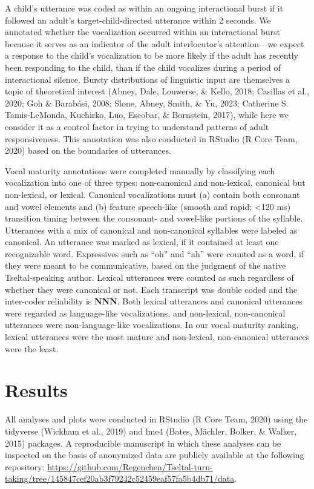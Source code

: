 \documentclass[
  man]{apa6}
\begin{document}
A child's utterance was coded as within an ongoing interactional burst if it followed an adult's target-child-directed utterance within 2 seconds. We annotated whether the vocalization occurred within an interactional burst because it serves as an indicator of the adult interlocutor's attention---we expect a response to the child's vocalization to be more likely if the adult has recently been responding to the child, than if the child vocalizes during a period of interactional silence. Bursty distributions of linguistic input are themselves a topic of theoretical interest (Abney, Dale, Louwerse, \& Kello, 2018; Casillas et al., 2020; Goh \& Barabási, 2008; Slone, Abney, Smith, \& Yu, 2023; Catherine S. Tamis-LeMonda, Kuchirko, Luo, Escobar, \& Bornstein, 2017), while here we consider it as a control factor in trying to understand patterns of adult responsiveness. This annotation was also conducted in RStudio (R Core Team, 2020) based on the boundaries of utterances.

Vocal maturity annotations were completed manually by classifying each vocalization into one of three types: non-canonical and non-lexical, canonical but non-lexical, or lexical. Canonical vocalizations must (a) contain both consonant and vowel elements and (b) feature speech-like (smooth and rapid; \textless120 ms) transition timing between the consonant- and vowel-like portions of the syllable. Utterances with a mix of canonical and non-canonical syllables were labeled as canonical. An utterance was marked as lexical, if it contained at least one recognizable word. Expressives such as ``oh'' and ``ah'' were counted as a word, if they were meant to be communicative, based on the judgment of the native Tseltal-speaking author. Lexical utterances were counted as such regardless of whether they were canonical or not. Each transcript was double coded and the inter-coder reliability is \textbf{NNN}. Both lexical utterances and canonical utterances were regarded as language-like vocalizations, and non-lexical, non-canonical utterances were non-language-like vocalizations. In our vocal maturity ranking, lexical utterances were the most mature and non-lexical, non-canonical utterances were the least.

\hypertarget{results}{%
\section{Results}\label{results}}

All analyses and plots were conducted in RStudio (R Core Team, 2020) using the tidyverse (Wickham et al., 2019) and lme4 (Bates, Mächler, Bolker, \& Walker, 2015) packages. A reproducible manuscript in which these analyses can be inspected on the basis of anonymized data are publicly available at the following repository: \url{https://github.com/Regenchen/Tseltal-turn-taking/tree/145847cef20ab3f79242c52459eaf57fa5b4db71/data}.
\end{document}
